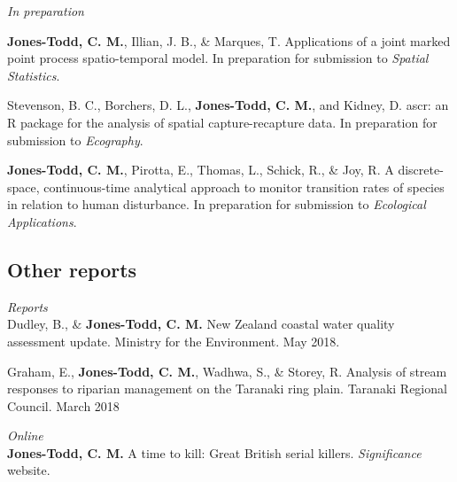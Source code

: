 \documentclass[10pt,a4paper]{moderncv}
\begin{document}
\textit{\small{In preparation}}\\

\vspace{-3pt}

\textbf{Jones-Todd, C. M.}, Illian, J. B., \& Marques, T. Applications of a joint marked point process spatio-temporal model. In preparation for submission to \textit{Spatial Statistics}.\\
\vspace{5pt}

\vspace{-3pt}
Stevenson, B. C., Borchers, D. L., \textbf{Jones-Todd, C. M.}, and Kidney, D. ascr: an R package for the analysis of spatial capture-recapture data. In preparation for submission to \textit{Ecography}.\\
\vspace{5pt}

\vspace{-3pt}

\textbf{Jones-Todd, C. M.}, Pirotta, E., Thomas, L., Schick, R., \& Joy, R.  A discrete-space, continuous-time analytical approach to monitor transition rates of species in relation to human disturbance.  In preparation for submission to \textit{Ecological Applications}.\\

\subsection{Other reports}

\vspace{5pt}

\textit{\small{Reports}}\\

Dudley, B., \& \textbf{Jones-Todd, C. M.} New Zealand coastal water quality assessment update. Ministry for the Environment. May 2018.

\vspace{5pt}

Graham, E., \textbf{Jones-Todd, C. M.}, Wadhwa, S., \& Storey, R. Analysis of stream responses to riparian management on the Taranaki ring plain. Taranaki Regional Council. March 2018\\
\newpage

\textit{\small{Online}}\\

\textbf{Jones-Todd, C. M.} A time to kill: Great British serial killers. \textit{Significance} website.
\end{document}
